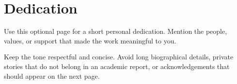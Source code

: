 \chapter*{Dedication}

{\large\itshape

Use this optional page for a short personal dedication. Mention the people, values, or support that made the work meaningful to you.

Keep the tone respectful and concise. Avoid long biographical details, private stories that do not belong in an academic report, or acknowledgements that should appear on the next page.

}

\clearpage
